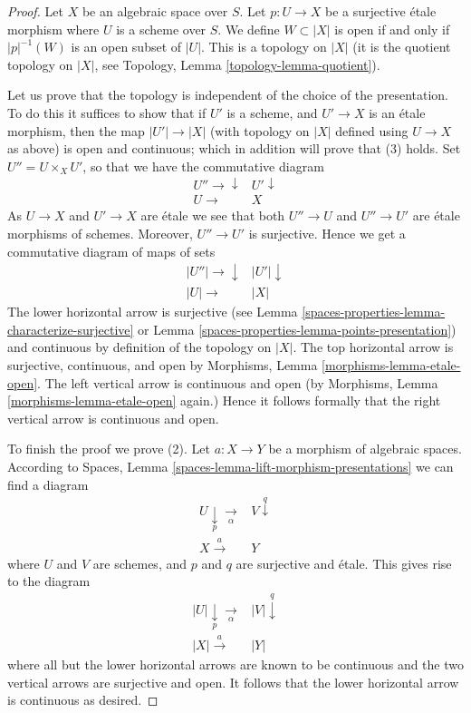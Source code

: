 \begin{proof}
Let $X$ be an algebraic space over $S$. Let $p : U \to X$ be a
surjective \'etale morphism where $U$ is a scheme over $S$.
We define $W \subset |X|$ is open if and only if $|p|^{-1}(W)$
is an open subset of $|U|$. This is a topology on $|X|$
(it is the quotient topology on $|X|$, see
Topology, Lemma \ref{topology-lemma-quotient}).

\medskip\noindent
Let us prove that the topology is independent of the choice of
the presentation. To do this it suffices to show that if $U'$ is a scheme,
and $U' \to X$ is an \'etale morphism, then the map $|U'| \to |X|$
(with topology on $|X|$ defined using $U \to X$ as above)
is open and continuous; which in addition will prove that (3) holds.
Set $U'' = U \times_X U'$, so that we have the commutative diagram
$$
\begin{array}{cc}U'' \longrightarrow\downarrow & U' \downarrow \\ U \longrightarrow & X\end{array}
$$
As $U \to X$ and $U' \to X$ are \'etale we see that
both $U'' \to U$ and $U'' \to U'$ are \'etale morphisms of schemes.
Moreover, $U'' \to U'$ is surjective. Hence
we get a commutative diagram of maps of sets
$$
\begin{array}{cc}|U''| \longrightarrow\downarrow & |U'| \downarrow \\ |U| \longrightarrow & |X|\end{array}
$$
The lower horizontal arrow is surjective (see
Lemma \ref{spaces-properties-lemma-characterize-surjective}
or
Lemma \ref{spaces-properties-lemma-points-presentation})
and continuous by definition of the topology on $|X|$.
The top horizontal arrow is surjective, continuous, and open by
Morphisms, Lemma \ref{morphisms-lemma-etale-open}.
The left vertical arrow is continuous and open (by
Morphisms, Lemma \ref{morphisms-lemma-etale-open}
again.) Hence it follows formally that the right vertical
arrow is continuous and open.

\medskip\noindent
To finish the proof we prove (2).
Let $a : X \to Y$ be a morphism of algebraic spaces. According to
Spaces, Lemma \ref{spaces-lemma-lift-morphism-presentations}
we can find a diagram
$$
\begin{array}{cc}U \underset{p}{\downarrow}\underset{\alpha}{\longrightarrow} & V \overset{q}{\downarrow} \\ X \overset{a}{\longrightarrow} & Y\end{array}
$$
where $U$ and $V$ are schemes, and $p$ and $q$ are surjective and \'etale.
This gives rise to the diagram
$$
\begin{array}{cc}|U| \underset{p}{\downarrow}\underset{\alpha}{\longrightarrow} & |V| \overset{q}{\downarrow} \\ |X| \overset{a}{\longrightarrow} & |Y|\end{array}
$$
where all but the lower horizontal arrows are known to be continuous and
the two vertical arrows are surjective and open. It follows that the
lower horizontal arrow is continuous as desired.
\end{proof}

